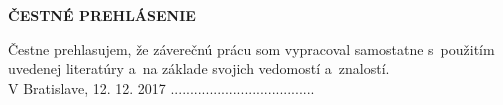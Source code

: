 \newpage
\thispagestyle{plain}
\vspace*{19cm}
\begin{large}
\noindent
\textbf{ČESTNÉ PREHLÁSENIE} \\
\end{large}
\noindent
Čestne prehlasujem, že záverečnú prácu som vypracoval samostatne s~použitím uvedenej literatúry a~na základe svojich
vedomostí a~znalostí.
\vspace*{1.5cm}\\
V Bratislave, 12. 12. 2017 \hspace*{6.5cm}.....................................\\
\hspace*{11.5cm} \Author
\afterpage{\blankpage}
